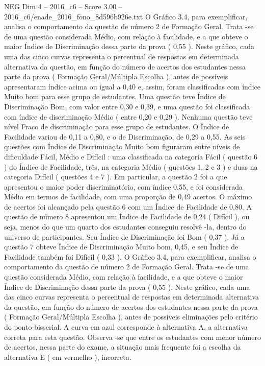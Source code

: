 \begin{textsample}{NEG Dim 4 – 2016\_c6 – Score 3.00 – 2016\_c6/enade\_2016\_fono\_8d596b926e.txt}
O Gráfico 3.4, para exemplificar, analisa o comportamento da questão de número 2 de Formação Geral.
Trata -se de uma questão considerada Médio, com relação à facilidade, e a que obteve o maior Índice de Discriminação dessa parte da prova ( 0,55 ).
Neste gráfico, cada uma das cinco curvas representa o percentual de respostas em determinada alternativa da questão, em função do número de acertos dos estudantes nessa parte da prova ( Formação Geral/Múltipla Escolha ), antes de possíveis apresentaram índice acima ou igual a 0,40 e, assim, foram classificadas com índice Muito bom para esse grupo de estudantes.
Uma questão teve Índice de Discriminação Bom, com valor entre 0,30 e 0,39, e uma questão foi classificada com índice de discriminação Médio ( entre 0,20 e 0,29 ).
Nenhuma questão teve nível Fraco de discriminação para esse grupo de estudantes.
O Índice de Facilidade variou de 0,11 a 0,80, e o de Discriminação, de 0,29 a 0,55.
As seis questões com Índice de Discriminação Muito bom figuraram entre níveis de dificuldade Fácil, Médio e Difícil : uma classificada na categoria Fácil ( questão 6 ) do Índice de Facilidade, três, na categoria Médio ( questões 1, 2 e 3 ) e duas na categoria Difícil ( questões 4 e 7 ).
Em particular, a questão 2 foi a que apresentou o maior poder discriminatório, com índice 0,55, e foi considerada Médio em termos de facilidade, com uma proporção de 0,49 acertos.
O máximo de acertos foi alcançado pela questão 6 com um Índice de Facilidade de 0,80.
A questão de número 8 apresentou um Índice de Facilidade de 0,24 ( Difícil ), ou seja, menos do que um quarto dos estudantes conseguiu resolvê -la, dentro do universo de participantes.
Seu Índice de Discriminação foi Bom ( 0,37 ).
Já a questão 7 obteve Índice de Discriminação Muito bom, 0,45, e seu Índice de Facilidade também foi Difícil ( 0,33 ).
O Gráfico 3.4, para exemplificar, analisa o comportamento da questão de número 2 de Formação Geral.
Trata -se de uma questão considerada Médio, com relação à facilidade, e a que obteve o maior Índice de Discriminação dessa parte da prova ( 0,55 ).
Neste gráfico, cada uma das cinco curvas representa o percentual de respostas em determinada alternativa da questão, em função do número de acertos dos estudantes nessa parte da prova ( Formação Geral/Múltipla Escolha ), antes de possíveis eliminações pelo critério do ponto-bisserial.
A curva em azul corresponde à alternativa A, a alternativa correta para esta questão.
Observa -se que entre os estudantes com menor número de acertos, nessa parte do exame, a situação mais frequente foi a escolha da alternativa E ( em vermelho ), incorreta.

\end{textsample}
